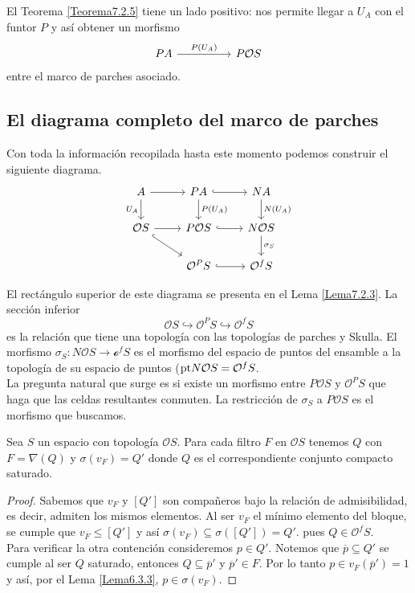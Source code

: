 El Teorema \ref{Teorema7.2.5} tiene un lado positivo: nos permite llegar a $U_A$ con el funtor $P$ y así obtener un morfismo 
\[\begin{tikzcd}
	PA && {P\mathcal{O}S}
	\arrow["{P(U_A)}", from=1-1, to=1-3]
\end{tikzcd}\]
entre el marco de parches asociado.

\subsection{El diagrama completo del marco de parches}

Con toda la información recopilada hasta este momento podemos construir el siguiente diagrama.
\[\begin{tikzcd}
	A & PA & NA \\
	{\mathcal{O}S} & {P\mathcal{O}S} & {N\mathcal{O}S} \\
	& {\mathcal{O}^PS} & {\mathcal{O}^fS}
	\arrow[from=1-1, to=1-2]
	\arrow["{U_A}"', from=1-1, to=2-1]
	\arrow[hook, from=1-2, to=1-3]
	\arrow["{P(U_A)}", from=1-2, to=2-2]
	\arrow["{N(U_A)}", from=1-3, to=2-3]
	\arrow[from=2-1, to=2-2]
	\arrow[hook, from=2-1, to=3-2]
	\arrow[hook, from=2-2, to=2-3]
	\arrow["{\sigma_S}", from=2-3, to=3-3]
	\arrow[hook, from=3-2, to=3-3]
\end{tikzcd}\]

El rectángulo superior de este diagrama se presenta en el Lema \ref{Lema7.2.3}. La sección inferior
\[
\mathcal{O}S\hookrightarrow \mathcal{O}^PS\hookrightarrow \mathcal{O}^fS
\]
es la relación que tiene una topología con las topologías de parches y Skulla. El morfismo $\sigma_S\colon N\mathcal{O}S\to \mathcal{o}^fS$ es el morfismo del espacio de puntos del ensamble a la topología de su espacio de puntos ($\mathrm{pt} N\mathcal{O}S=\mathcal{O}^fS$.\\

La pregunta natural que surge es si existe un morfismo entre $P\mathcal{O}S$ y $\mathcal{O}^PS$ que haga que las celdas resultantes conmuten. La restricción de $\sigma_S$ a $P\mathcal{O}S$ es el morfismo que buscamos.

\begin{lem}\label{Lema7.3.1}
    Sea $S$ un espacio con topología $\mathcal{O}S$. Para cada filtro $F$ en $\mathcal{O}S$ tenemos $Q$ con $F=\nabla(Q)$ y $\sigma(v_F)=Q'$ donde $Q$ es el correspondiente conjunto compacto saturado.
\end{lem}

\begin{proof}
    Sabemos que $v_F$ y $[Q']$ son compañeros bajo la relación de admisibilidad, es decir, admiten los mismos elementos. Al ser $v_F$ el mínimo elemento del bloque, se cumple que $v_F\leq [Q']$ y así $\sigma(v_F)\subseteq \sigma([Q'])=Q'$. pues $Q\in \mathcal{O}^fS$.\\

    Para verificar la otra contención consideremos $p\in Q'$. Notemos que $\overline{p}\subseteq Q'$ se cumple al ser $Q$ saturado, entonces $Q\subseteq \overline{p}'$ y $\overline{p}'\in F$. Por lo tanto $p\in v_F(\overline{p}')=1$ y así, por el Lema \ref{Lema6.3.3}, $p\in \sigma(v_F)$.
\end{proof}

